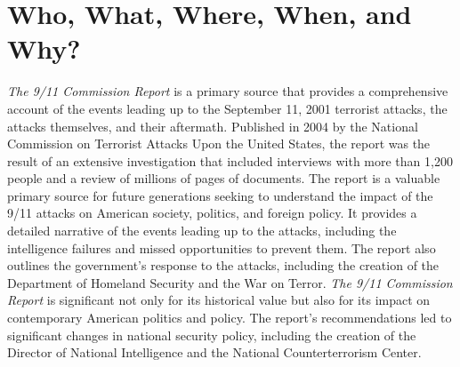 \documentclass[a4paper, 12pt]{article}
\begin{document}
 
\tableofcontents
\pagebreak
\section{Who, What, Where, When, and Why?}
\hspace{\parindent} \textit{The 9/11 Commission Report} is a primary source that provides a comprehensive account of the events leading up to the September 11, 2001 terrorist attacks, the attacks themselves, and their aftermath. Published in 2004 by the National Commission on Terrorist Attacks Upon the United States, the report was the result of an extensive investigation that included interviews with more than 1,200 people and a review of millions of pages of documents. The report is a valuable primary source for future generations seeking to understand the impact of the 9/11 attacks on American society, politics, and foreign policy. It provides a detailed narrative of the events leading up to the attacks, including the intelligence failures and missed opportunities to prevent them. The report also outlines the government's response to the attacks, including the creation of the Department of Homeland Security and the War on Terror. \textit{The 9/11 Commission Report} is significant not only for its historical value but also for its impact on contemporary American politics and policy. The report's recommendations led to significant changes in national security policy, including the creation of the Director of National Intelligence and the National Counterterrorism Center. 
\end{document}
